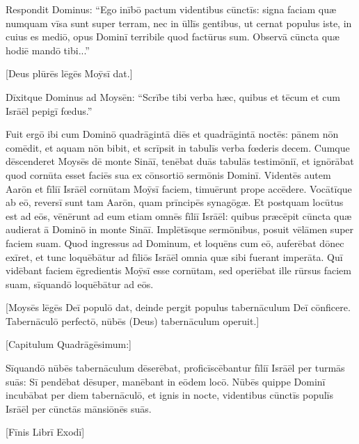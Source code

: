 Respondit Dominus: ``Ego inībō pactum videntibus cūnctīs: signa faciam quæ numquam vīsa sunt
super terram, nec in ūllīs gentibus, ut cernat populus iste, in cuius es
mediō, opus Dominī terribile quod factūrus sum. 
Observā cūncta quæ hodiē mandō tibi...''

[Deus plūrēs lēgēs Moȳsī dat.] 

Dīxitque Dominus ad
Moysēn: ``Scrībe tibi verba hæc, quibus et tēcum et cum
Isrāēl pepigī fœdus.''

Fuit ergō ibi cum
Dominō quadrāgintā diēs et quadrāgintā noctēs: pānem nōn comēdit, et aquam
nōn bibit, et scrīpsit in tabulīs verba fœderis decem. 
Cumque
dēscenderet Moysēs dē monte Sināī, tenēbat duās tabulās testimōniī, et ignōrābat quod
cornūta esset faciēs sua ex
cōnsortiō
sermōnis Dominī. 
Videntēs autem Aarōn et fīliī Isrāēl
cornūtam Moȳsī faciem, timuērunt prope accēdere. 
Vocātīque ab eō, reversī sunt tam Aarōn, quam prīncipēs
synagōgæ. Et postquam locūtus est ad eōs, 
vēnērunt ad
eum etiam omnēs fīliī Isrāēl: quibus præcēpit cūncta quæ audierat ā Dominō
in monte Sināī. 
Implētīsque sermōnibus, posuit vēlāmen
super faciem suam. 
Quod ingressus ad Dominum,
et loquēns cum eō, auferēbat dōnec exīret, et tunc loquēbātur ad fīliōs
Isrāēl omnia quæ sibi fuerant imperāta. 
Quī vidēbant faciem ēgredientis
Moȳsī esse cornūtam, sed operiēbat ille rūrsus faciem suam,
sīquandō loquēbātur ad eōs.

[Moysēs lēgēs Deī populō dat,
deinde pergit populus tabernāculum Deī cōnficere.
Tabernāculō perfectō, nūbēs (Deus) tabernāculum operuit.]

[Capitulum Quadrāgēsimum:]

Sīquandō nūbēs tabernāculum dēserēbat,
proficīscēbantur fīliī Isrāēl per turmās
suās: 
Sī pendēbat dēsuper, manēbant in
eōdem locō. 
Nūbēs quippe Dominī
incubābat per diem tabernāculō, et ignis in nocte,
videntibus cūnctīs populīs Isrāēl per cūnctās mānsiōnēs suās.

[Fīnis Librī Exodī] 
